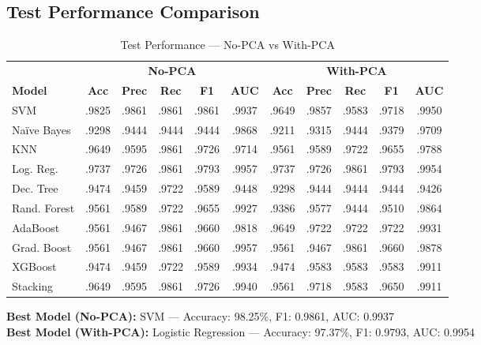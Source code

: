 \documentclass[12pt,a4paper]{article}
\begin{document}
\subsection{Test Performance Comparison}

\begin{table}[H]
\centering
\caption{Test Performance — No-PCA vs With-PCA}
\label{tab:test_results}
\vspace{0.2cm}
\small
\begin{tabular}{l|ccccc|ccccc}
\toprule
& \multicolumn{5}{c|}{\textbf{No-PCA}} & \multicolumn{5}{c}{\textbf{With-PCA}} \\
\textbf{Model} & \textbf{Acc} & \textbf{Prec} & \textbf{Rec} & \textbf{F1} & \textbf{AUC} & \textbf{Acc} & \textbf{Prec} & \textbf{Rec} & \textbf{F1} & \textbf{AUC} \\
\midrule
SVM & .9825 & .9861 & .9861 & .9861 & .9937 & .9649 & .9857 & .9583 & .9718 & .9950 \\
Na\"ive Bayes & .9298 & .9444 & .9444 & .9444 & .9868 & .9211 & .9315 & .9444 & .9379 & .9709 \\
KNN & .9649 & .9595 & .9861 & .9726 & .9714 & .9561 & .9589 & .9722 & .9655 & .9788 \\
Log. Reg. & .9737 & .9726 & .9861 & .9793 & .9957 & .9737 & .9726 & .9861 & .9793 & .9954 \\
Dec. Tree & .9474 & .9459 & .9722 & .9589 & .9448 & .9298 & .9444 & .9444 & .9444 & .9426 \\
Rand. Forest & .9561 & .9589 & .9722 & .9655 & .9927 & .9386 & .9577 & .9444 & .9510 & .9864 \\
AdaBoost & .9561 & .9467 & .9861 & .9660 & .9818 & .9649 & .9722 & .9722 & .9722 & .9931 \\
Grad. Boost & .9561 & .9467 & .9861 & .9660 & .9957 & .9561 & .9467 & .9861 & .9660 & .9878 \\
XGBoost & .9474 & .9459 & .9722 & .9589 & .9934 & .9474 & .9583 & .9583 & .9583 & .9911 \\
Stacking & .9649 & .9595 & .9861 & .9726 & .9940 & .9561 & .9718 & .9583 & .9650 & .9911 \\
\bottomrule
\end{tabular}
\end{table}

\textbf{Best Model (No-PCA):} SVM — Accuracy: 98.25\%, F1: 0.9861, AUC: 0.9937\\
\textbf{Best Model (With-PCA):} Logistic Regression — Accuracy: 97.37\%, F1: 0.9793, AUC: 0.9954
\end{document}
